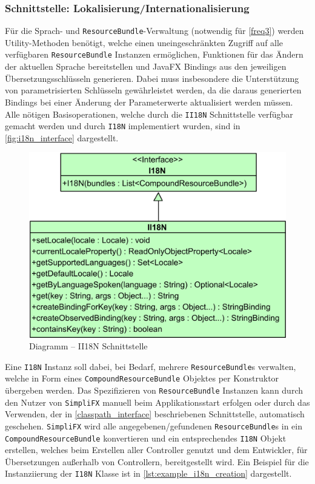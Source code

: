 \subsubsection{Schnittstelle: Lokalisierung/Internationalisierung}
Für die Sprach- und \texttt{ResourceBundle}-Verwaltung (notwendig für \autoref{freq3}) werden Utility-Methoden benötigt, welche einen uneingeschränkten Zugriff auf alle verfügbaren \texttt{ResourceBundle} Instanzen ermöglichen, Funktionen für das Ändern der aktuellen Sprache bereitstellen und JavaFX Bindings aus den jeweiligen Übersetzungsschlüsseln generieren. Dabei muss insbesondere die Unterstützung von parametrisierten Schlüsseln gewährleistet werden, da die daraus generierten Bindings bei einer Änderung der Parameterwerte aktualisiert werden müssen. Alle nötigen Basisoperationen, welche durch die \texttt{II18N} Schnittstelle verfügbar gemacht werden und durch \texttt{I18N} implementiert wurden, sind in \autoref{fig:i18n_interface} dargestellt.
\begin{figure}[H]
	\centering
	\includegraphics[width=\textwidth-2cm]{Abbildungen/I18N.png}
	\caption{Diagramm -- II18N Schnittstelle}
	\label{fig:i18n_interface}
\end{figure}
\noindent Eine \texttt{I18N} Instanz soll dabei, bei Bedarf, mehrere \texttt{ResourceBundle}s verwalten, welche in Form eines \texttt{CompoundResourceBundle} Objektes per Konstruktor übergeben werden. Das Spezifizieren von \texttt{ResourceBundle} Instanzen kann durch den Nutzer von \texttt{SimpliFX} manuell beim Applikationsstart erfolgen oder durch das Verwenden, der in \autoref{classpath_interface} beschriebenen Schnittstelle, automatisch geschehen. \texttt{SimpliFX} wird alle angegebenen/gefundenen \texttt{ResourceBundle}s in ein \texttt{CompoundResourceBundle} konvertieren und ein entsprechendes \texttt{I18N} Objekt erstellen, welches beim Erstellen aller Controller genutzt und dem Entwickler, für Übersetzungen außerhalb von Controllern, bereitgestellt wird. Ein Beispiel für die Instanziierung der \texttt{I18N} Klasse ist in \autoref{lst:example_i18n_creation} dargestellt.
